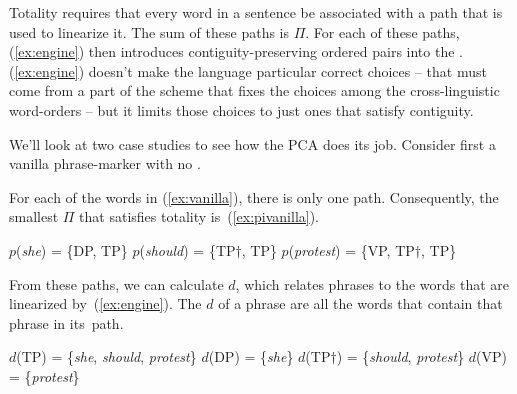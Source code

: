\documentclass[output=paper]{langsci/langscibook}
\begin{document}
Totality requires that every word in a sentence be associated with a path that is used to linearize it. The sum of these paths is $\Pi$. For each of these paths, (\ref{ex:engine}) then introduces contiguity-preserving ordered pairs into the . (\ref{ex:engine}) doesn't make the language particular correct choices -- that must come from a part of the  scheme that fixes the choices among the cross-linguistic word-orders -- but it limits those choices to just ones that satisfy contiguity.

We'll look at two case studies to see how the \gls{PCA} does its job. Consider
first a vanilla phrase-marker with no .

\ea\label{ex:vanilla}
\z


For each of the words in (\ref{ex:vanilla}), there is only one path. Consequently, the smallest $\Pi$ that satisfies totality is~(\ref{ex:pivanilla}).
\begin{exe}
	\ex \label{ex:pivanilla}
	\begin{xlist}
		\ex $p$(\emph{she}) = \{DP, TP\}
		\ex $p$(\emph{should}) = \{TP$\dag$, TP\}
		\ex $p$(\emph{protest}) = \{VP, TP$\dag$, TP\}
	\end{xlist}
\end{exe}

From these paths, we can calculate $d$, which relates phrases to the words that are linearized by~(\ref{ex:engine}). The $d$ of a phrase are all the words that contain that phrase in its~path.
\begin{exe}
	\ex \label{ex:dvanilla}
	\begin{xlist}
		\ex $d$(TP) = \{\emph{she}, \emph{should}, \emph{protest}\}
		\ex $d$(DP) = \{\emph{she}\}
		\ex $d$(TP$\dag$) = \{\emph{should}, \emph{protest}\}
		\ex $d$(VP) = \{\emph{protest}\}
	\end{xlist}
\end{exe}
\end{document}
